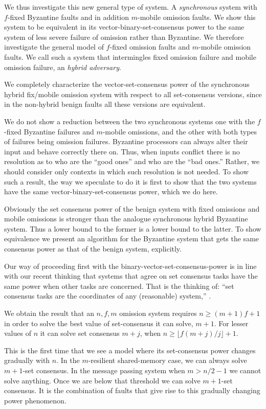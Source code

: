 \documentclass[11pt]{article}
\begin{document}
We thus investigate this new general type of system. A \emph{synchronous} system with $f$-fixed Byzantine faults and in addition
$m$-mobile omission faults. We show this system to be equivalent in its vector-binary-set-consensus power
 to the same system of less 
severe failure of omission rather than Byzantine. We therefore investigate the general model of $f$-fixed omission faults
and $m$-mobile omission faults. We call such a system that intermingles fixed omission failure and mobile 
omission failure, an \emph{hybrid adversary}.

We completely characterize the vector-set-consensus power of the synchronous hybrid fix/mobile omission system with
respect to all set-consensus versions, since
in the non-hybrid benign faults all these versions are equivalent.

We do  not show a reduction between the two synchronous systems one with the $f$-fixed Byzantine failures and $m$-mobile omissions, and the other
with both types of failures being omission failures. Byzantine processors can always alter their input
and behave correctly there on. Thus, when inputs conflict there is no resolution as to who are the ``good ones'' and 
who are the ``bad ones.'' Rather, we should consider only contexts in which such resolution is not needed. To show
such a result, the way  we speculate to do it is first to show that the two systems have the same vector-binary-set-consensus power,
which we do here.

Obviously the set consensus power of the benign system with fixed omissions and mobile omissions is stronger
than the analogue synchronous hybrid Byzantine system. Thus a lower bound to the former
is a lower bound to the latter.  To show equivalence we present an algorithm
for the Byzantine system that gets the same consensus power as that of the benign system, explicitly.

Our way of proceeding first with the binary-vector-set-consensus-power is in line with our recent thinking that systems
that agree on set consensus tasks have the same power when other tasks are concerned. That is the thinking of:
``set consensus tasks are the coordinates of any (reasonable) system,'' \cite{CSC}.


We obtain the result that an $n,f,m$ omission system requires $n \geq (m+1)f+1$ in order to solve the best value of 
set-consensus it can solve, $m+1$. For lesser values of $n$ it can solve set consensus $m+j$, when 
$n \geq \lfloor f(m+j)/j \rfloor +1$.


This is the first time that we see a model where its set-consensus power changes gradually with $n$.
In the $m$-resilient shared-memory case, we can always solve $m+1$-set consensus. In the message
passing system when $m > n/2-1$ we cannot solve anything. Once we are below that threshold we can
solve $m+1$-set consensus. It is the combination of faults that give rise to this gradually changing
power phenomenon.
\end{document}
